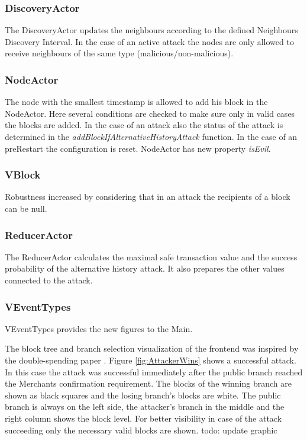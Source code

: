 \subsubsection{DiscoveryActor}
The DiscoveryActor updates the neighbours according to the defined Neighbours Discovery Interval. In the case of an active attack the nodes are only allowed to receive neighbours of the same type (malicious/non-malicious).

\subsubsection{NodeActor}
The node with the smallest timestamp is allowed to add his block in the NodeActor. Here several conditions are checked to make sure only in valid cases the blocks are added. In the case of an attack also the status of the attack is determined in the \textit{addBlockIfAlternativeHistoryAttack} function.
In the case of an preRestart the configuration is reset.
NodeActor has new property \textit{isEvil}.

\subsubsection{VBlock}
Robustness increased by considering that in an attack the recipients of a block can be null.

\subsubsection{ReducerActor}
The ReducerActor calculates the maximal safe transaction value and the success probability of the alternative history attack. It also prepares the other values connected to the attack.

\subsubsection{VEventTypes}
VEventTypes provides the new figures to the Main.

The block tree and branch selection visualization of the frontend was inspired by the double-spending paper \cite{doublespending}. Figure \ref{fig:AttackerWins} shows a successful attack. In this case the attack was successful immediately after the public branch reached the Merchants confirmation requirement. The blocks of the winning branch are shown as black squares and the losing branch's blocks are white. The public branch is always on the left side, the attacker's branch in the middle and the right column shows the block level. For better visibility in case of the attack succeeding only the necessary valid blocks are shown.
todo: update graphic

